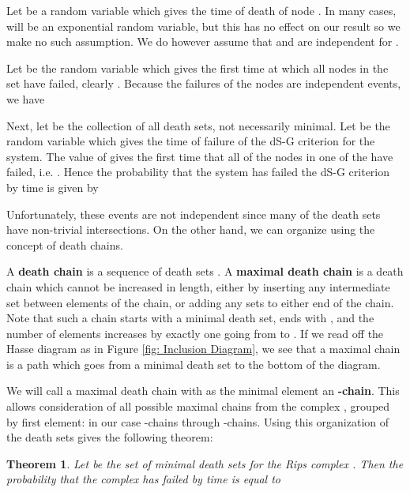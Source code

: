 \documentclass[10pt,twocolumn]{article} \usepackage{amsmath,epsf,amssymb,cite,pifont,amsthm, mathrsfs,epsfig,  bbm, amsthm,  setspace}
\newtheorem{thm}{Theorem}
\renewcommand{\1}{\mathbbm{1}}
\begin{document}
Let  be a random variable which gives the time of death of node .
In many cases,  will be an exponential random variable,
but this has no effect on our result so we make no such assumption.
We do however assume that  and  are independent for .

Let  be the random variable which gives the first time at which all nodes in the set have
failed,
clearly .
Because the failures of the nodes are independent events, we have

Next, let  be the collection of all death sets, not necessarily minimal.
Let  be the random variable which gives the time of failure of the dS-G criterion for the system.
The value of  gives the first time that all of the nodes in one of the  have failed,
i.e. .
Hence the probability that the system has failed the dS-G criterion by time  is given by

Unfortunately, these events are not independent since many of the death sets have non-trivial intersections.
On the other hand, we can organize  using the concept of death chains.

A \textbf{death chain} is a sequence
 of death sets .
A \textbf{maximal death chain} is a death chain which cannot be increased in length, either by inserting any
intermediate set between elements of the chain, or adding any sets to either end of the chain.
Note that such a chain starts with a minimal death set,
ends with , and the number of elements increases by exactly one going from
 to .
If we read off the Hasse diagram as in Figure \ref{fig: Inclusion Diagram},
we see that a maximal chain is a path which goes from a minimal death set to the bottom of the diagram.




We will call a maximal death chain with  as the minimal element an \textbf{-chain}.
This allows consideration of all possible maximal chains from the complex ,
grouped by first element: in our case -chains through -chains.
Using this organization of the death sets gives the following theorem:


\begin{thm}
Let  be the set of minimal death sets for the Rips complex .
Then the probability that the complex has failed by time  is equal to

	
	
\end{thm}
\end{document}
